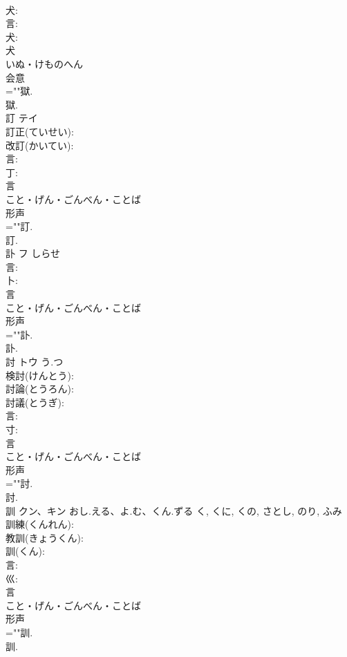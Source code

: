 \documentclass[8pt]{extreport}
\begin{document}
\begin{CJK}{UTF8}{min}
\\	犬: 
\\	言: 
\\	犬: 
\\	犬	
\\	いぬ・けものへん	
\\	会意 
\\	=""獄.
\\	獄.
\\	訂	テイ			
\\	訂正(ていせい): 
\\	改訂(かいてい): 
\\	言: 
\\	丁: 
\\	言	
\\	こと・げん・ごんべん・ことば	
\\	形声 
\\	=""訂.
\\	訂.
\\	訃	フ	しらせ		
\\	言: 
\\	卜: 
\\	言	
\\	こと・げん・ごんべん・ことば	
\\	形声 
\\	=""訃.
\\	訃.
\\	討	トウ	う.つ		
\\	検討(けんとう): 
\\	討論(とうろん): 
\\	討議(とうぎ): 
\\	言: 
\\	寸: 
\\	言	
\\	こと・げん・ごんべん・ことば	
\\	形声 
\\	=""討.
\\	討.
\\	訓	クン、キン	おし.える、よ.む、くん.ずる	く, くに, くの, さとし, のり, ふみ	
\\	訓練(くんれん): 
\\	教訓(きょうくん): 
\\	訓(くん): 
\\	言: 
\\	巛: 
\\	言	
\\	こと・げん・ごんべん・ことば	
\\	形声 
\\	=""訓.
\\	訓.

\end{CJK}
\end{document}
